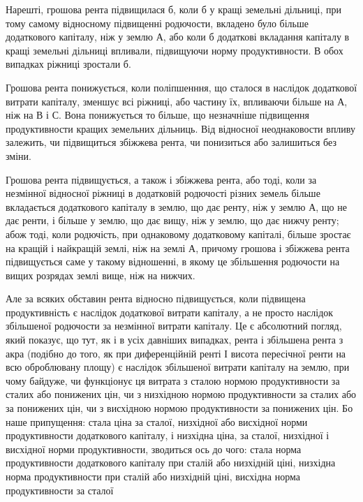 
Нарешті, грошова рента підвищилася б, коли б у кращі земельні дільниці,
при тому самому відносному підвищенні родючости, вкладено було більше
додаткового капіталу, ніж у землю А, або коли б додаткові вкладання капіталу в кращі
земельні дільниці впливали, підвищуючи норму продуктивности. В обох випадках
ріжниці зростали б.

Грошова рента понижується, коли поліпшенння, що сталося в наслідок
додаткової витрати капіталу, зменшує всі ріжниці, або частину їх, впливаючи
більше на А, ніж на В і С. Вона понижується то більше, що незначніше
підвищення продуктивности кращих земельних дільниць. Від відносної неоднаковости
впливу залежить, чи підвищиться збіжжева рента, чи понизиться або
залишиться без зміни.

Грошова рента підвищується, а також і збіжжева рента, або тоді, коли за
незмінної відносної ріжниці в додатковій родючості різних земель більше вкладається
додаткового капіталу в землю, що дає ренту, ніж у землю А, що не дає
ренти, і більше у землю, що дає вищу, ніж у землю, що дає нижчу ренту;
абож тоді, коли родючість, при однаковому додатковому капіталі, більше зростає
на кращій і найкращій землі, ніж на землі А, причому грошова і збіжжева
рента підвищується саме у такому відношенні, в якому це збільшення родючости
на вищих розрядах землі вище, ніж на нижчих.

Але за всяких обставин рента відносно підвищується, коли підвищена продуктивність
є наслідок додаткової витрати капіталу, а не просто наслідок
збільшеної родючости за незмінної витрати капіталу. Це є абсолютний погляд,
який показує, що тут, як і в усіх давніших випадках, рента і збільшена рента з акра
(подібно до того, як при диференційній ренті І висота пересічної ренти на всю
оброблювану площу) є наслідок збільшеної витрати капіталу на землю, при
чому байдуже, чи функціонує ця витрата з сталою нормою продуктивности за
сталих або понижених цін, чи з низхідною нормою продуктивности за сталих або
за понижених цін, чи з висхідною нормою продуктивности за понижених цін.
Бо наше припущення: стала ціна за сталої, низхідної або висхідної норми продуктивности додаткового
капіталу, і низхідна ціна, за сталої, низхідної і висхідної
норми продуктивности, зводиться ось до чого: стала норма продуктивности додаткового капіталу при
сталій або низхідній ціні, низхідна норма продуктивности
при сталій або низхідній ціні, висхідна норма продуктивности за сталої

\parbreak{}  %
